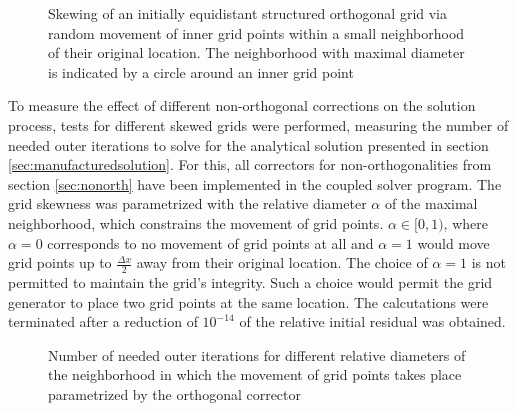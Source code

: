 \begin{figure}[h!]
  \begin{center}
    
    \caption{Skewing of an initially equidistant structured orthogonal grid via random movement of inner grid points within a small neighborhood of their original location. The neighborhood with maximal diameter is indicated by a circle around an inner grid point}
    \label{fig:nonorthgrid}
  \end{center}
\end{figure}

To measure the effect of different non-orthogonal corrections on the solution process, tests for different skewed grids were performed, measuring the number of needed outer iterations to solve for the analytical solution presented in section \ref{sec:manufacturedsolution}.  For this, all correctors for non-orthogonalities from section \ref{sec:nonorth} have been implemented in the coupled solver program. The grid skewness was parametrized with the relative diameter \(\alpha\) of the maximal neighborhood, which constrains the movement of grid points. \(\alpha \in [0,1) \), where \(\alpha = 0\) corresponds to no movement of grid points at all and \(\alpha = 1\) would move grid points up to \(\textstyle \frac{\Delta x}{2} \) away from their original location. The choice of \(\alpha = 1\) is not permitted to maintain the grid's integrity. Such a choice would permit the grid generator to place two grid points at the same location. The calcutations were terminated after a reduction of \(10^{-14}\) of the relative initial residual was obtained.

\begin{figure}
  \begin{center}
  \end{center}
\caption{Number of needed outer iterations for different relative diameters of the neighborhood in which the movement of grid points takes place parametrized by the orthogonal corrector}
\label{fig:nonorth}
\end{figure}

